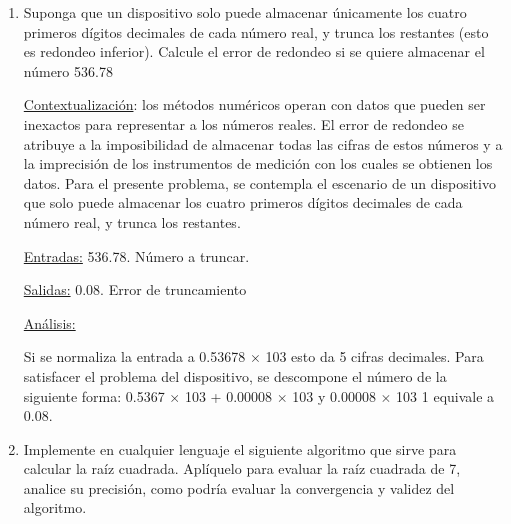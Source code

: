 \documentclass[12pt]{article}
\renewcommand{\_}{\kern-1.5pt\textunderscore\kern-1.5pt}
\begin{document}
\begin{enumerate}
	\item Suponga que un dispositivo solo puede almacenar únicamente los cuatro primeros dígitos decimales de cada número real, y trunca los restantes (esto es redondeo inferior). Calcule el error de redondeo si se quiere almacenar el número 536.78\par


\vspace{\baselineskip}
\begin{justify}
\uline{Contextualización}: los métodos numéricos operan con datos que pueden ser inexactos para representar a los números reales. El error de redondeo se atribuye a la imposibilidad de almacenar todas las cifras de estos números y a la imprecisión de los instrumentos de medición con los cuales se obtienen los datos. Para el presente problema, se contempla el escenario de un dispositivo que solo puede almacenar los cuatro primeros dígitos decimales de cada número real, y trunca los restantes.
\end{justify}\par

\begin{justify}
\uline{Entradas:} 536.78. Número a truncar. 
\end{justify}\par

\begin{justify}
\uline{Salidas:} 0.08. Error de truncamiento
\end{justify}\par

\begin{justify}
\uline{Análisis:}{\fontsize{10pt}{12.0pt}\selectfont  \par}Si se normaliza la entrada a 0.53678 $ \times $  103 esto da 5 cifras decimales. Para satisfacer el problema del dispositivo, se descompone el número de la siguiente forma: 0.5367 $ \times $  103 + 0.00008 $ \times $  103 y 0.00008 $ \times $  103 1 equivale a 0.08.
\end{justify}\par


\vspace{\baselineskip}
	\item Implemente en cualquier lenguaje el siguiente algoritmo que sirve para calcular la raíz cuadrada. Aplíquelo para evaluar la raíz cuadrada de 7, analice su precisión, como podría evaluar la convergencia y validez del algoritmo.\par



\end{enumerate}
\end{document}
